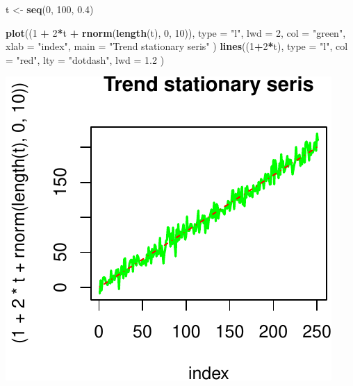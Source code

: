 \documentclass[11pt,]{article}
\newenvironment{Shaded}{\begin{snugshade}}{\end{snugshade}}
\newcommand{\KeywordTok}[1]{\textcolor[rgb]{0.13,0.29,0.53}{\textbf{#1}}}
\newcommand{\DataTypeTok}[1]{\textcolor[rgb]{0.13,0.29,0.53}{#1}}
\newcommand{\DecValTok}[1]{\textcolor[rgb]{0.00,0.00,0.81}{#1}}
\newcommand{\FloatTok}[1]{\textcolor[rgb]{0.00,0.00,0.81}{#1}}
\newcommand{\StringTok}[1]{\textcolor[rgb]{0.31,0.60,0.02}{#1}}
\newcommand{\OperatorTok}[1]{\textcolor[rgb]{0.81,0.36,0.00}{\textbf{#1}}}
\newcommand{\NormalTok}[1]{#1}
\begin{document}
\begin{Shaded}
\begin{Highlighting}[]
\NormalTok{t <-}\StringTok{ }\KeywordTok{seq}\NormalTok{(}\DecValTok{0}\NormalTok{, }\DecValTok{100}\NormalTok{, }\FloatTok{0.4}\NormalTok{)}

\KeywordTok{plot}\NormalTok{((}\DecValTok{1} \OperatorTok{+}\StringTok{ }\DecValTok{2}\OperatorTok{*}\NormalTok{t }\OperatorTok{+}\StringTok{ }\KeywordTok{rnorm}\NormalTok{(}\KeywordTok{length}\NormalTok{(t), }\DecValTok{0}\NormalTok{, }\DecValTok{10}\NormalTok{)),}
     \DataTypeTok{type =} \StringTok{"l"}\NormalTok{,}
     \DataTypeTok{lwd =} \DecValTok{2}\NormalTok{,}
     \DataTypeTok{col =} \StringTok{"green"}\NormalTok{,}
     \DataTypeTok{xlab =} \StringTok{"index"}\NormalTok{,}
     \DataTypeTok{main =} \StringTok{"Trend stationary seris"}
\NormalTok{     )}
\KeywordTok{lines}\NormalTok{((}\DecValTok{1}\OperatorTok{+}\DecValTok{2}\OperatorTok{*}\NormalTok{t),}
      \DataTypeTok{type =} \StringTok{"l"}\NormalTok{,}
      \DataTypeTok{col =} \StringTok{"red"}\NormalTok{,}
      \DataTypeTok{lty =} \StringTok{"dotdash"}\NormalTok{,}
      \DataTypeTok{lwd =} \FloatTok{1.2}
\NormalTok{      )}
\end{Highlighting}
\end{Shaded}

\begin{center}\includegraphics{FMC_T4_PhD_Fin_Time_Series_files/figure-latex/trend_stationary-1} \end{center}
\end{document}
